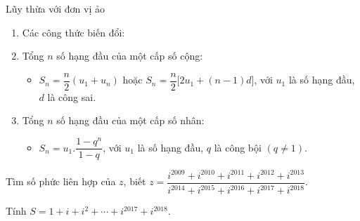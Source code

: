 \begin{dang}{Lũy thừa với đơn vị ảo}
\begin{enumerate}
	\item Các công thức biến đổi:
	\begin{itemize}
	\end{itemize}
	\item Tổng $n$ số hạng đầu của một cấp số cộng:
	\begin{itemize}
		\item $S_n=\dfrac{n}{2}\left( u_1+u_n\right)$ hoặc $S_n=\dfrac{n}{2}\big[2u_1+(n-1)d\big]$, với $u_1$ là số hạng đầu, $d$ là công sai.
	\end{itemize}
	\item Tổng $n$ số hạng đầu của một cấp số nhân:
	\begin{itemize}
		\item $S_n=u_1.\dfrac{1-q^n}{1-q}$, với $u_1$ là số hạng đầu, $q$ là công bội $(q \ne 1)$.
	\end{itemize}
\end{enumerate}
\end{dang}
\begin{vd} 
Tìm số phức liên hợp của $z$, biết $z = \dfrac{i^{2009} + i^{2010} + i^{2011} + i^{2012} + i^{2013}}{i^{2014} + i^{2015} + i^{2016} + i^{2017} + i^{2018}}$.
\end{vd}

\begin{vd}%
Tính $S=1+i+i^2+ \cdots +i^{2017}+i^{2018}$.
\end{vd}

